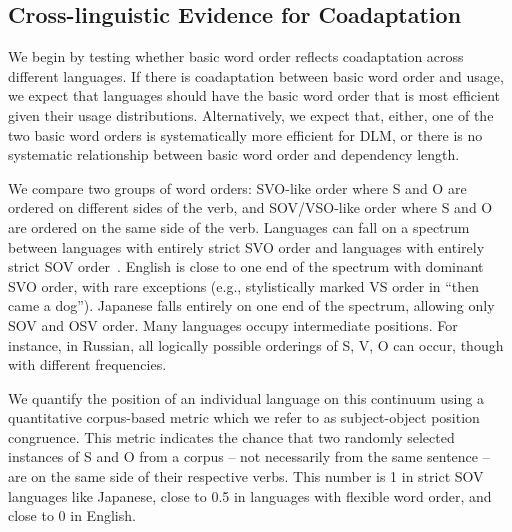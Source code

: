 \documentclass[11pt,a4paper]{article}
\begin{document}
\subsection*{Cross-linguistic Evidence for Coadaptation}

We begin by testing whether basic word order reflects coadaptation across different languages.
If there is coadaptation between basic word order and usage, we expect that languages should have the basic word order that is most efficient given their usage distributions.
Alternatively, we expect that, either, one of the two basic word orders is systematically more efficient for DLM, or there is no systematic relationship between basic word order and dependency length.




We compare two groups of word orders: SVO-like order where S and O are ordered on different sides of the verb, and SOV/VSO-like order where S and O are ordered on the same side of the verb.
Languages can fall on a spectrum between languages with entirely strict SVO order and languages with entirely strict SOV order~\citep{steele1978word}.
English is close to one end of the spectrum with dominant SVO order, with rare exceptions (e.g., stylistically marked VS order in ``then came a dog'').
Japanese falls entirely on one end of the spectrum, allowing only SOV and OSV order.
Many languages occupy intermediate positions. 
For instance, in Russian, all logically possible orderings of S, V, O can occur, though with different frequencies.

We quantify the position of an individual language on this continuum using a quantitative corpus-based metric which we refer to as subject-object position congruence.
This metric indicates the chance that two randomly selected instances of S and O from a corpus -- not necessarily from the same sentence -- are on the same side of their respective verbs. This number is 1 in strict SOV languages like Japanese, close to 0.5 in languages with flexible word order, and close to 0 in English.
\end{document}
